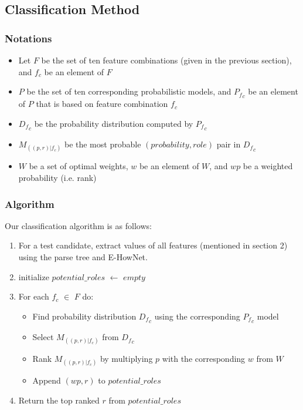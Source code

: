 \documentclass[11pt]{article}
\begin{document}
\subsection{Classification Method}
\subsubsection*{Notations}
\begin{itemize}
\item Let $F$ be the set of ten feature combinations (given in the previous section), and $f_c$ be an element of $F$
\item $P$ be the set of ten corresponding probabilistic models, and ${P_f}_c$ be an element of $P$ that is based on feature combination $f_c$ 
\item ${D_f}_c$ be the probability distribution computed by ${P_f}_c$ 
\item $M_{((p,r)|f_c)}$ be the most probable $(probability,role)$ pair in  ${D_f}_c$
\item $W$ be a set of optimal weights, $w$ be an element of $W$, and $wp$ be a weighted probability (i.e. rank)
\end{itemize} 
\subsubsection*{Algorithm}
Our classification algorithm is as follows:
\begin{enumerate}
\item For a test candidate, extract values of all features (mentioned in section 2) using the parse tree and E-HowNet.
\item initialize $potential\_roles$  $\leftarrow$ $empty$ 
\item For each $f_c$  $\in$ $F$ do:
\begin{itemize}
 \item Find probability distribution ${D_f}_c$ using the corresponding ${P_f}_c$ model
 \item Select $M_{((p,r)|f_c)}$ from ${D_f}_c$
 \item Rank $M_{((p,r)|f_c)}$ by multiplying $p$ with the corresponding $w$ from $W$
 \item Append $(wp,r)$ to $potential\_roles$
 \end{itemize}
\item Return the top ranked $r$ from $potential\_roles$
 \end{enumerate}
\end{document}
